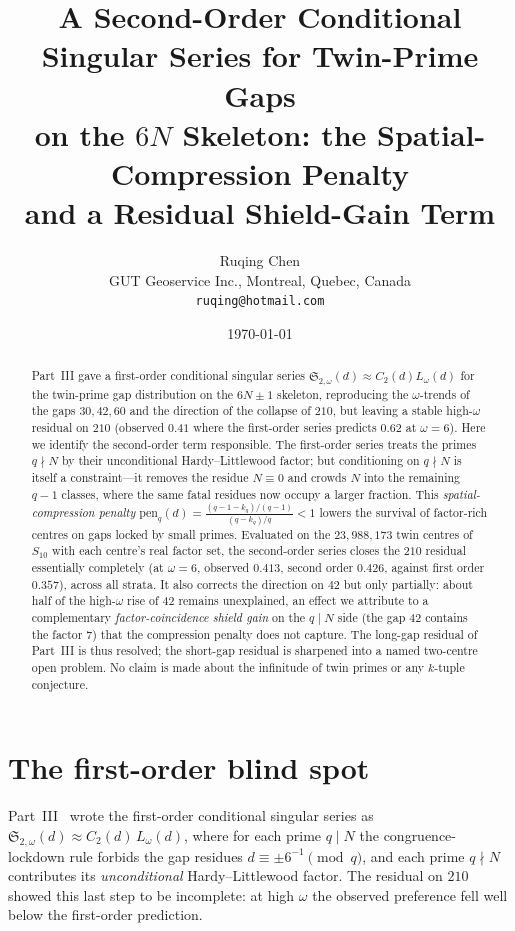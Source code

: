 \documentclass[11pt]{article}
\title{A Second-Order Conditional Singular Series for Twin-Prime Gaps\\
on the $6N$ Skeleton: the Spatial-Compression Penalty\\
and a Residual Shield-Gain Term}
\author{Ruqing Chen\\
\small GUT Geoservice Inc., Montreal, Quebec, Canada\\
\small \texttt{ruqing@hotmail.com}}
\date{\today}
\begin{document}
\maketitle

\begin{abstract}
Part~III gave a first-order conditional singular series
$\mathfrak{S}_{2,\omega}(d)\approx C_2(d)L_\omega(d)$ for the twin-prime gap
distribution on the $6N\pm1$ skeleton, reproducing the $\omega$-trends of the
gaps $30,42,60$ and the direction of the collapse of $210$, but leaving a stable
high-$\omega$ residual on $210$ (observed $0.41$ where the first-order series
predicts $0.62$ at $\omega=6$). Here we identify the second-order term
responsible. The first-order series treats the primes $q\nmid N$ by their
unconditional Hardy--Littlewood factor; but conditioning on $q\nmid N$ is itself
a constraint---it removes the residue $N\equiv0$ and crowds $N$ into the
remaining $q-1$ classes, where the same fatal residues now occupy a larger
fraction. This \emph{spatial-compression penalty}
$\mathrm{pen}_q(d)=\frac{(q-1-k_q)/(q-1)}{(q-k_q)/q}<1$ lowers the survival of
factor-rich centres on gaps locked by small primes. Evaluated on the
$23{,}988{,}173$ twin centres of $S_{10}$ with each centre's real factor set,
the second-order series closes the $210$ residual essentially completely (at
$\omega=6$, observed $0.413$, second order $0.426$, against first order $0.357$),
across all strata. It also corrects the direction on $42$ but only partially:
about half of the high-$\omega$ rise of $42$ remains unexplained, an effect we
attribute to a complementary \emph{factor-coincidence shield gain} on the
$q\mid N$ side (the gap $42$ contains the factor $7$) that the compression
penalty does not capture. The long-gap residual of Part~III is thus resolved;
the short-gap residual is sharpened into a named two-centre open problem. No
claim is made about the infinitude of twin primes or any $k$-tuple conjecture.
\end{abstract}

\section{The first-order blind spot}

Part~III~\cite{ChenIII} wrote the first-order conditional singular series as
$\mathfrak{S}_{2,\omega}(d)\approx C_2(d)\,L_\omega(d)$, where for each prime
$q\mid N$ the congruence-lockdown rule forbids the gap residues
$d\equiv\pm6^{-1}\pmod q$, and each prime $q\nmid N$ contributes its
\emph{unconditional} Hardy--Littlewood factor. The residual on $210$ showed this
last step to be incomplete: at high $\omega$ the observed preference fell well
below the first-order prediction.
\end{document}
